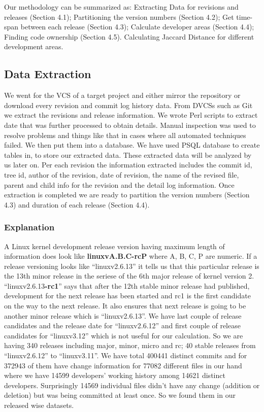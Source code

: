 \documentclass{acm_proc_article-sp}
\begin{document}
Our methodology can be summarized as: Extracting Data for revisions and releases (Section 4.1); Partitioning the version numbers (Section 4.2); Get time-span between each release (Section 4.3); Calculate developer areas (Section 4.4); Finding code ownership (Section 4.5). Calculating Jaccard Distance for different development areas.

\subsection{Data Extraction}
We went for the VCS of a target project and either mirror the repository or download every revision and commit log history data. From DVCSs such as Git we extract the revisions and release information. We wrote Perl scripts to extract date that was further processed to obtain details. Manual inspection was used to resolve problems and things like that in cases where all automated techniques failed.
We then put them into a database. We have used PSQL database to create tables in, to store our extracted data. These extracted data will be analyzed by us later on. Per each revision the information extracted includes the commit id, tree id, author of the revision, date of revision, the name of the revised file, parent and child info for the revision and the detail log information. Once extraction is completed we are ready to partition the version numbers (Section 4.3) and duration  of each release (Section 4.4).

\subsubsection{Explanation}
A Linux kernel development release version having maximum length of information does look like \textbf{linuxvA.B.C-rcP} where A, B, C, P are numeric. If a release versioning looks like ``linuxv2.6.13'' it tells us that this particular release is the 13th minor release  in the seriese of the 6th major release of kernel version 2. ``linuxv2.6.13\textbf{-rc1}'' says that after the 12th stable minor release had published, development for the next release has been started and rc1 is the first candidate on the way to the next release. It also ensures that next release is going to be another minor release which is ``linuxv2.6.13''. We have last couple of release candidates and the release date for ``linuxv2.6.12'' and first couple of release candidates for ``linuxv3.12'' which is not useful for our calculation. So we are having 340 releases including major, minor, micro and rc; 40 stable releases from ``linuxv2.6.12'' to ``linuxv3.11''. We have total 400441 distinct commits and for 372943 of them have change information for 77082 different files in our hand where we have 14599 developers' working history among 14621 distinct developers. Surprisingly 14569 individual files didn't have any change (addition or deletion) but was being committed at least once. So we found them in our released wise datasets.
\end{document}

